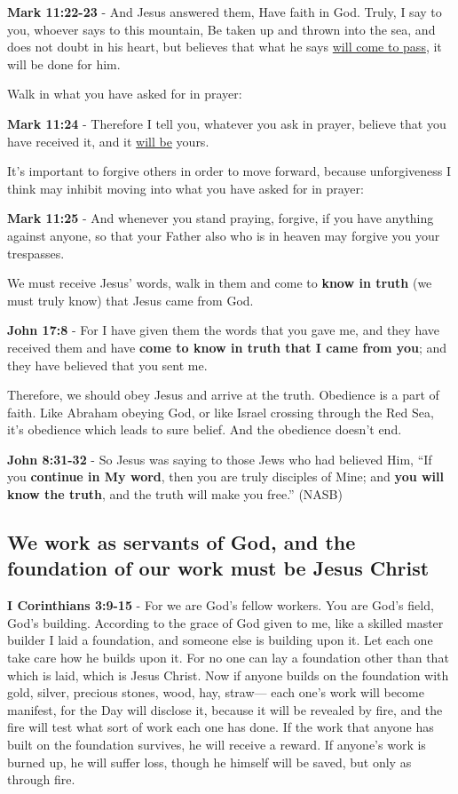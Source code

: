 \documentclass[11pt]{article}
\begin{document}
\textbf{Mark 11:22-23} - And Jesus answered them, Have faith in God. Truly, I say to you, whoever says to this mountain, Be taken up and thrown into the sea, and does not doubt in his heart, but believes that what he says \uline{will come to pass}, it will be done for him.

Walk in what you have asked for in prayer:

\textbf{Mark 11:24} - Therefore I tell you, whatever you ask in prayer, believe that you have received it, and it \uline{will be} yours.

It's important to forgive others in order to move forward, because unforgiveness I think may inhibit moving into what you have asked for in prayer:

\textbf{Mark 11:25} - And whenever you stand praying, forgive, if you have anything against anyone, so that your Father also who is in heaven may forgive you your trespasses.

We must receive Jesus' words, walk in them and come to \textbf{know in truth} (we must truly know) that Jesus came from God.

\textbf{John 17:8} - For I have given them the words that you gave me, and they have received them and have \textbf{come to know in truth that I came from you}; and they have believed that you sent me.

Therefore, we should obey Jesus and arrive at the truth. Obedience is a part of faith. Like Abraham obeying God, or like Israel crossing through the Red Sea, it's obedience which leads to sure belief.
And the obedience doesn't end.

\textbf{John 8:31-32} - So Jesus was saying to those Jews who had believed Him, “If you \textbf{continue in My word}, then you are truly disciples of Mine; and \textbf{you will know the truth}, and the truth will make you free.” (NASB)

\subsection{We work as servants of God, and the foundation of our work must be Jesus Christ}
\label{sec:org57766d2}
\textbf{I Corinthians 3:9-15} - For we are God's fellow workers. You are God's field, God's building.  According to the grace of God given to me, like a skilled master builder I laid a foundation, and someone else is building upon it. Let each one take care how he builds upon it.  For no one can lay a foundation other than that which is laid, which is Jesus Christ.  Now if anyone builds on the foundation with gold, silver, precious stones, wood, hay, straw— each one's work will become manifest, for the Day will disclose it, because it will be revealed by fire, and the fire will test what sort of work each one has done.  If the work that anyone has built on the foundation survives, he will receive a reward.  If anyone's work is burned up, he will suffer loss, though he himself will be saved, but only as through fire.
\end{document}
